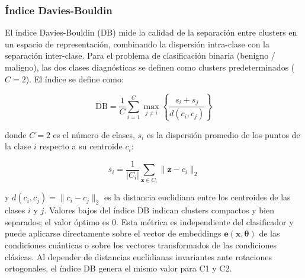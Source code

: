 
\subsubsection{Índice Davies-Bouldin}

El índice Davies-Bouldin (DB) \cite{davies1979cluster}
mide la calidad de la separación entre clusters en un
espacio de representación, combinando la dispersión
intra-clase con la separación inter-clase. Para el
problema de clasificación binaria (benigno / maligno),
las dos clases diagnósticas se definen como clusters
predeterminados ($C = 2$). El índice se define como:

\begin{equation}
  \text{DB} =
  \frac{1}{C}\sum_{i=1}^{C}
  \max_{j \neq i}
  \left\{
  \frac{s_i + s_j}{d(c_i, c_j)}
  \right\}
  \label{eq:davies_bouldin}
\end{equation}

\noindent donde $C = 2$ es el número de clases,
$s_i$ es la dispersión promedio de los puntos de la
clase $i$ respecto a su centroide $c_i$:

\begin{equation}
  s_i = \frac{1}{|C_i|}
  \sum_{\mathbf{z} \in C_i}
  \|\mathbf{z} - c_i\|_2
  \label{eq:dispersion}
\end{equation}

\noindent y $d(c_i, c_j) = \|c_i - c_j\|_2$ es la
distancia euclidiana entre los centroides de las clases
$i$ y $j$. Valores bajos del índice DB indican clusters
compactos y bien separados; el valor óptimo es 0.
Esta métrica es independiente del clasificador y puede
aplicarse directamente sobre el vector de embeddings
$\mathbf{e}(\mathbf{x}, \boldsymbol{\theta})$ de las
condiciones cuánticas o sobre los vectores transformados
de las condiciones clásicas. Al depender de distancias
euclidianas invariantes ante rotaciones ortogonales,
el índice DB genera el mismo valor para C1 y C2.
